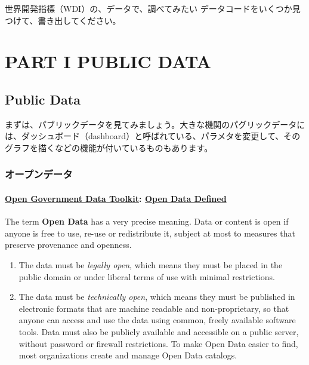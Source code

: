 \documentclass[
  xelatex, ja=standard]{bxjsbook}
\providecommand{\tightlist}{%
  \setlength{\itemsep}{0pt}\setlength{\parskip}{0pt}}
\theoremstyle{definition}
\theoremstyle{definition}
\theoremstyle{definition}
\theoremstyle{definition}
\theoremstyle{remark}
\begin{document}
世界開発指標（WDI）の、データで、調べてみたい データコードをいくつか見つけて、書き出してください。

\hypertarget{part-part-i-public-data}{%
\part{PART I PUBLIC DATA}\label{part-part-i-public-data}}

\hypertarget{publicdata}{%
\chapter{Public Data}\label{publicdata}}

まずは、パブリックデータを見てみましょう。大きな機関のパグリックデータには、ダッシュボード（dashboard）と呼ばれている、パラメタを変更して、そのグラフを描くなどの機能が付いているものもあります。

\hypertarget{ux30aaux30fcux30d7ux30f3ux30c7ux30fcux30bf}{%
\section{オープンデータ}\label{ux30aaux30fcux30d7ux30f3ux30c7ux30fcux30bf}}

\hypertarget{open-government-data-toolkit-open-data-defined}{%
\subsection{\texorpdfstring{\href{http://opendatatoolkit.worldbank.org}{Open Government Data Toolkit}: \href{http://opendatatoolkit.worldbank.org/en/essentials.html}{Open Data Defined}}{Open Government Data Toolkit: Open Data Defined}}\label{open-government-data-toolkit-open-data-defined}}

The term \textbf{Open Data} has a very precise meaning. Data or content is open if anyone is free to use, re-use or redistribute it, subject at most to measures that preserve provenance and openness.

\begin{enumerate}
\def\labelenumi{\arabic{enumi}.}
\tightlist
\item
  The data must be \emph{legally open}, which means they must be placed in the public domain or under liberal terms of use with minimal restrictions.
\item
  The data must be \emph{technically open}, which means they must be published in electronic formats that are machine readable and non-proprietary, so that anyone can access and use the data using common, freely available software tools. Data must also be publicly available and accessible on a public server, without password or firewall restrictions. To make Open Data easier to find, most organizations create and manage Open Data catalogs.
\end{enumerate}
\end{document}
